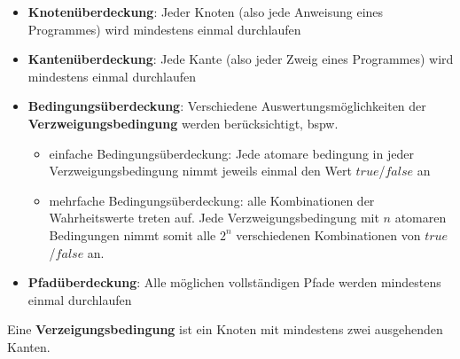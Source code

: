 \begin{itemize}
    \item \textbf{Knotenüberdeckung}: Jeder Knoten (also jede Anweisung eines Programmes) wird mindestens einmal durchlaufen
    \item \textbf{Kantenüberdeckung}: Jede Kante (also jeder Zweig eines Programmes) wird mindestens einmal durchlaufen
    \item \textbf{Bedingungsüberdeckung}: Verschiedene Auswertungsmöglichkeiten der \textbf{Verzweigungsbedingung} werden berücksichtigt, bspw.
    \begin{itemize}
        \item einfache Bedingungsüberdeckung: Jede atomare bedingung in jeder Verzweigungsbedingung nimmt jeweils einmal den Wert $true$/$false$ an
        \item mehrfache Bedingungsüberdeckung: alle Kombinationen der Wahrheitswerte treten auf. Jede Verzweigungsbedingung mit $n$ atomaren Bedingungen nimmt somit alle $2^n$ verschiedenen Kombinationen von $true$/$false$ an.
    \end{itemize}
    \item \textbf{Pfadüberdeckung}: Alle möglichen vollständigen Pfade werden mindestens einmal durchlaufen
\end{itemize}

\vspace{5mm}
\begin{tcolorbox}[title={Verzweigungsbedingung}]
    Eine \textbf{Verzeigungsbedingung} ist ein Knoten mit mindestens zwei ausgehenden Kanten.
\end{tcolorbox}
\vspace{5mm}